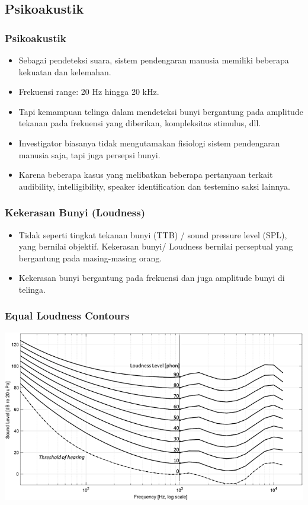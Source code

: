 \documentclass[pdflatex,compress]{beamer}
\begin{document}
\subsection{Psikoakustik}

\begin{frame}
	\frametitle{Psikoakustik}
	\begin{itemize}
		\item Sebagai pendeteksi suara, sistem pendengaran manusia memiliki beberapa kekuatan dan kelemahan.
		\item Frekuensi range: 20 Hz hingga 20 kHz.
		\item Tapi kemampuan telinga dalam mendeteksi bunyi bergantung pada amplitude tekanan pada frekuensi yang diberikan, kompleksitas stimulus, dll.
		\item Investigator biasanya tidak mengutamakan fisiologi sistem pendengaran manusia saja, tapi juga persepsi bunyi.
		\item Karena beberapa kasus yang melibatkan beberapa pertanyaan terkait audibility, intelligibility, speaker identification dan testemino saksi lainnya.
	\end{itemize}
\end{frame}

\begin{frame}
	\frametitle{Kekerasan Bunyi (Loudness)}
	\begin{itemize}
		\item Tidak seperti tingkat tekanan bunyi (TTB) / sound pressure level (SPL), yang bernilai objektif. Kekerasan bunyi/ Loudness bernilai perseptual yang bergantung pada masing-masing orang.
		\item Kekerasan bunyi bergantung pada frekuensi dan juga amplitude bunyi di telinga.
	\end{itemize}
\end{frame}

\begin{frame}
	\frametitle{Equal Loudness Contours}
	\begin{center}
			\includegraphics[width=0.9\linewidth]{img/img017}
	\end{center}
\end{frame}
\end{document}
